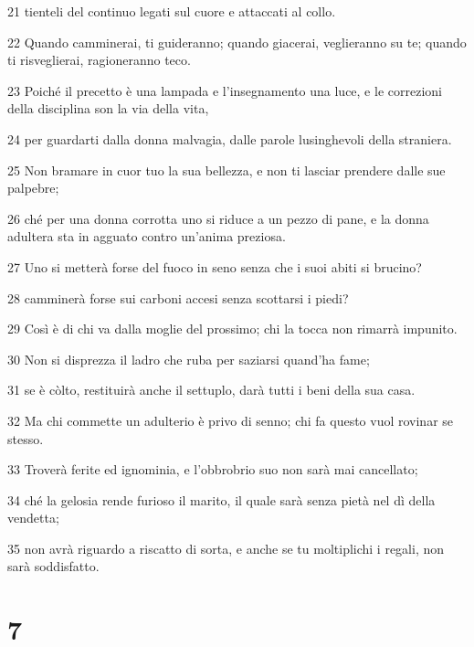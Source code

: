 \par 21 tienteli del continuo legati sul cuore e attaccati al collo.
\par 22 Quando camminerai, ti guideranno; quando giacerai, veglieranno su te; quando ti risveglierai, ragioneranno teco.
\par 23 Poiché il precetto è una lampada e l'insegnamento una luce, e le correzioni della disciplina son la via della vita,
\par 24 per guardarti dalla donna malvagia, dalle parole lusinghevoli della straniera.
\par 25 Non bramare in cuor tuo la sua bellezza, e non ti lasciar prendere dalle sue palpebre;
\par 26 ché per una donna corrotta uno si riduce a un pezzo di pane, e la donna adultera sta in agguato contro un'anima preziosa.
\par 27 Uno si metterà forse del fuoco in seno senza che i suoi abiti si brucino?
\par 28 camminerà forse sui carboni accesi senza scottarsi i piedi?
\par 29 Così è di chi va dalla moglie del prossimo; chi la tocca non rimarrà impunito.
\par 30 Non si disprezza il ladro che ruba per saziarsi quand'ha fame;
\par 31 se è còlto, restituirà anche il settuplo, darà tutti i beni della sua casa.
\par 32 Ma chi commette un adulterio è privo di senno; chi fa questo vuol rovinar se stesso.
\par 33 Troverà ferite ed ignominia, e l'obbrobrio suo non sarà mai cancellato;
\par 34 ché la gelosia rende furioso il marito, il quale sarà senza pietà nel dì della vendetta;
\par 35 non avrà riguardo a riscatto di sorta, e anche se tu moltiplichi i regali, non sarà soddisfatto.

\chapter{7}

